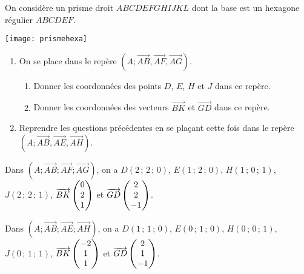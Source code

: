 \documentclass[11pt,fleqn, openany]{book} %
\begin{document}
\begin{exercise}
On considère un prisme droit $ABCDEFGHIJKL$ dont la base est un hexagone régulier $ABCDEF$. 

\begin{minipage}{0.3\linewidth}
 \begin{center}
\texttt{[image: prismehexa]}
\end{center}
\end{minipage}\hfill\begin{minipage}{0.68\linewidth}

\begin{enumerate}
\item On se place dans le repère $(A; \overrightarrow{AB}, \overrightarrow{AF},\overrightarrow{AG})$.
\begin{enumerate}
\item Donner les coordonnées des points $D$, $E$, $H$ et $J$ dans ce repère.
\item Donner les coordonnées des vecteurs $\overrightarrow{BK}$ et $\overrightarrow{GD}$ dans ce repère. 
\end{enumerate}
\item Reprendre les questions précédentes en se plaçant cette fois dans le repère $(A; \overrightarrow{AB}, \overrightarrow{AE},\overrightarrow{AH})$.
\end{enumerate}\end{minipage}

\end{exercise}

\begin{solution}
Dans \((A;\overrightarrow{AB};\overrightarrow{AF};\overrightarrow{AG})\), on a \(D(2\,;\,2\,;\,0)\), \(E(1\,;\,2\,;\,0)\), \(H(1\,;\,0\,;\,1)\), \(J(2\,;\,2\,;\,1)\), \(\overrightarrow{BK}\renewcommand{\arraystretch}{1}\renewcommand{\arraystretch}{1}\begin{pmatrix}0 \\ 2 \\ 1 \end{pmatrix}\) et \(\overrightarrow{GD}\renewcommand{\arraystretch}{1}\renewcommand{\arraystretch}{1}\begin{pmatrix}2 \\ 2 \\ -1\end{pmatrix}\). 

Dans \((A;\overrightarrow{AB};\overrightarrow{AE};\overrightarrow{AH})\), on a \(D(1\,;\,1\,;\,0)\), \(E(0\,;\,1\,;\,0)\), \(H(0\,;\,0\,;\,1)\), \(J(0\,;\,1\,;\,1)\), \(\overrightarrow{BK}\renewcommand{\arraystretch}{1}\renewcommand{\arraystretch}{1}\begin{pmatrix}-2 \\ 1 \\ 1 \end{pmatrix}\) et \(\overrightarrow{GD}\renewcommand{\arraystretch}{1}\renewcommand{\arraystretch}{1}\begin{pmatrix}2 \\ 1 \\ -1\end{pmatrix}\).
\end{solution}
\end{document}
